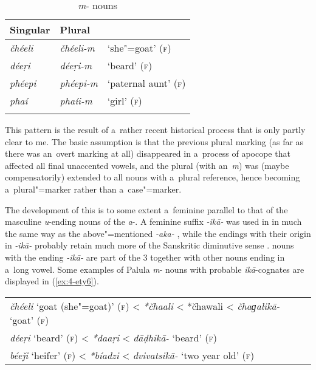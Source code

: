 \begin{table}[ht]
\caption{\textit{m}- nouns}
\begin{tabularx}{.75\textwidth}{ Q Q l }
\lsptoprule
Singular &
Plural &
\\\midrule
\textit{čhéeli } &
\textit{čhéeli-m} &
`she"=goat' (\textsc{f})\\
\textit{déeṛi} &
\textit{déeṛi-m} &
`beard' (\textsc{f})\\
\textit{phéepi} &
\textit{phéepi-m} &
`paternal aunt' (\textsc{f})\\
\textit{phaí} &
\textit{phaíi-m} &
`girl' (\textsc{f})\\\lspbottomrule
\end{tabularx}
\label{tab:4-16}
\end{table}


This pattern is the result of a~rather recent historical process that is only partly clear to me. The basic assumption is that the previous plural marking (as far as there was an~overt marking at all) disappeared in a~process of apocope that affected all final unaccented vowels, and the plural  (with an~\textit{m}) was (maybe compensatorily) extended to all nouns with a~plural reference, hence becoming a~plural"=marker rather than a~case"=marker.


The development of this  is to some extent a~feminine parallel to that of the masculine \textit{u}-ending nouns of the \textit{a}-. A feminine  suffix \textit{-ikā-} was used in \iliOIA in much the same way as the above"=mentioned \textit{-aka-} \citep[1222]{whitney1960}, while the \iliNIA endings with their origin in \textit{-ikā-} probably retain much more of the Sanskritic diminutive sense \citep[222]{masica1991}. \iliOIA nouns with the ending \textit{-ikā-} are part of the \iliOIA {} 3 together with other nouns ending in a~long vowel. Some examples of Palula \textit{m}- nouns with probable \iliOIA \textit{ikā}-cognates are displayed in (\ref{ex:4-ety6}). 


\begin{exe}
\extab
\label{ex:4-ety6}
\begin{tabular}{ l }
\textit{čhéeli} `goat (she"=goat)' (\textsc{f}) {\textless} \textit{*čhaali} {\textless} *čhawali {\textless} \textit{čhaɡalikā-} `goat' (\textsc{f})\\
\textit{déeṛi} `beard' (\textsc{f}) {\textless} \textit{*daaṛi} {\textless} \textit{dāḍhikā-} `beard' (\textsc{f})\\
\textit{béeǰi} `heifer' (\textsc{f}) {\textless} \textit{*bíadzi} {\textless} \textit{dvivatsikā-} `two year old' (\textsc{f})
\end{tabular}
\end{exe}


